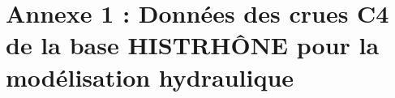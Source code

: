 \documentclass[11pt]{article}
\begin{document}
\section{Annexe 1 : Données des crues C4 de la base HISTRHÔNE pour la modélisation hydraulique}
\label{sec:TabC4}
%
%
%	
\end{document}

